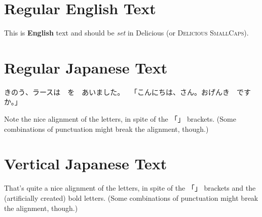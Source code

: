 \documentclass[12pt]{article}
\begin{document}
\section*{Regular English Text}

This is \textbf{English} text and should be \textit{set} in Delicious
(or \textsc{Delicious SmallCaps}).

\section*{Regular Japanese Text}

きのう、ラースは　を　あいました。　
「こんにちは、さん。おげんき　ですか。」

Note the nice alignment of the letters, in spite of the 「」 brackets.
(Some combinations of punctuation might break the alignment, though.)

\section*{Vertical Japanese Text}

\begin{figure}[h!]
\begin{center}
\end{center}
\end{figure}

That's quite a nice alignment of the letters, in spite of the 「」 brackets
and the (artificially created) bold letters. (Some combinations of punctuation
might break the alignment, though.)
\end{document}
